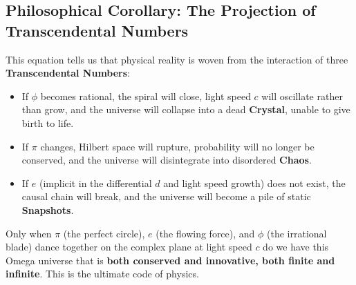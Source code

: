 \subsection{Philosophical Corollary: The Projection of Transcendental Numbers}

This equation tells us that physical reality is woven from the interaction of three \textbf{Transcendental Numbers}:

\begin{itemize}
\item If \textbf{$\phi$} becomes rational, the spiral will close, light speed $c$ will oscillate rather than grow, and the universe will collapse into a dead \textbf{Crystal}, unable to give birth to life.
\item If \textbf{$\pi$} changes, Hilbert space will rupture, probability will no longer be conserved, and the universe will disintegrate into disordered \textbf{Chaos}.
\item If \textbf{$e$} (implicit in the differential $d$ and light speed growth) does not exist, the causal chain will break, and the universe will become a pile of static \textbf{Snapshots}.
\end{itemize}

Only when $\pi$ (the perfect circle), $e$ (the flowing force), and $\phi$ (the irrational blade) dance together on the complex plane at light speed $c$ do we have this Omega universe that is \textbf{both conserved and innovative, both finite and infinite}. This is the ultimate code of physics.
